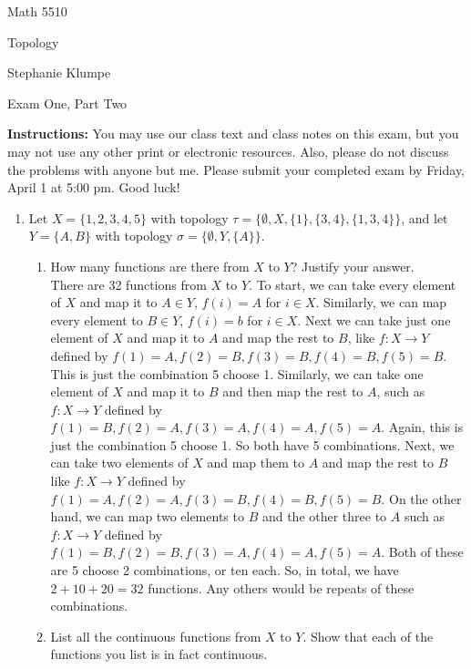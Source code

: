 \documentclass[12pt]{article}
\begin{document}
\noindent Math 5510

\noindent Topology

\noindent Stephanie Klumpe

\vspace{.2in}
\begin{center}
Exam One, Part Two
\end{center}

\noindent \textbf{Instructions:} You may use our class text and class notes on this exam, but you may not use any other print or electronic resources. Also, please do not discuss the problems with anyone but me. Please submit your completed exam by Friday, April 1 at 5:00 pm. Good luck!

\begin{enumerate}
\item Let $X = \{1,2,3,4,5\}$ with topology $\tau=\{\emptyset, X, \{1\}, \{3, 4\}, \{1, 3, 4\}\}$, and let $Y = \{A,B\}$ with topology $\sigma=\{\emptyset, Y, \{A\}\}$. 
\begin{enumerate}
\item How many functions are there from $X$ to $Y$? Justify your answer.\\
There are 32 functions from $X$ to $Y$. To start, we can take every element of $X$ and map it to $A\in Y$, $f(i)=A$ for $i\in X$. Similarly, we can map every element to $B\in Y$, $f(i)=b$ for $i\in X$. Next we can take just one element of $X$ and map it to $A$ and map the rest to $B$, like $f:X\rightarrow Y$ defined by $f(1)=A, f(2)=B, f(3)=B, f(4)=B, f(5)=B$. This is just the combination 5 choose 1. Similarly, we can take one element of $X$ and map it to $B$ and then map the rest to $A$, such as $f:X\rightarrow Y$ defined by $f(1)=B, f(2)=A, f(3)=A, f(4)=A, f(5)=A$. Again, this is just the combination 5 choose 1. So both have 5 combinations. Next, we can take two elements of $X$ and map them to $A$ and map the rest to $B$ like $f:X\rightarrow Y$ defined by $f(1)=A, f(2)=A, f(3)=B, f(4)=B, f(5)=B$. On the other hand, we can map two elements to $B$ and the other three to $A$ such as $f:X\rightarrow Y$ defined by $f(1)=B, f(2)=B, f(3)=A, f(4)=A, f(5)=A$. Both of these are 5 choose 2 combinations, or ten each. So, in total, we have $2+10+20=32$ functions. Any others would be repeats of these combinations.
\item List all the continuous functions from $X$ to $Y$. Show that each of the functions you list is in fact continuous.\\

\end{enumerate}
\end{enumerate}
\end{document}
